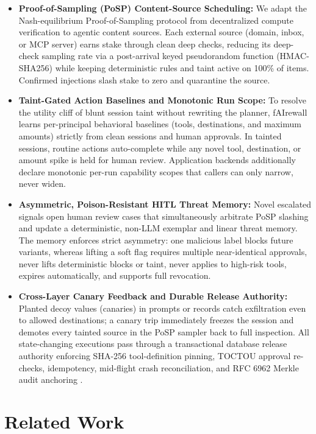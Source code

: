 \documentclass[conference]{IEEEtran}
\begin{document}
\begin{itemize}
    \item \textbf{Proof-of-Sampling (PoSP) Content-Source Scheduling:} We adapt the Nash-equilibrium Proof-of-Sampling protocol \cite{zhang2024posp} from decentralized compute verification to agentic content sources. Each external source (domain, inbox, or MCP server) earns stake through clean deep checks, reducing its deep-check sampling rate via a post-arrival keyed pseudorandom function (HMAC-SHA256) while keeping deterministic rules and taint active on 100\% of items. Confirmed injections slash stake to zero and quarantine the source.
    \item \textbf{Taint-Gated Action Baselines and Monotonic Run Scope:} To resolve the utility cliff of blunt session taint without rewriting the planner, fAIrewall learns per-principal behavioral baselines (tools, destinations, and maximum amounts) strictly from clean sessions and human approvals. In tainted sessions, routine actions auto-complete while any novel tool, destination, or amount spike is held for human review. Application backends additionally declare monotonic per-run capability scopes that callers can only narrow, never widen.
    \item \textbf{Asymmetric, Poison-Resistant HITL Threat Memory:} Novel escalated signals open human review cases that simultaneously arbitrate PoSP slashing and update a deterministic, non-LLM exemplar and linear threat memory. The memory enforces strict asymmetry: one malicious label blocks future variants, whereas lifting a soft flag requires multiple near-identical approvals, never lifts deterministic blocks or taint, never applies to high-risk tools, expires automatically, and supports full revocation.
    \item \textbf{Cross-Layer Canary Feedback and Durable Release Authority:} Planted decoy values (canaries) in prompts or records catch exfiltration even to allowed destinations; a canary trip immediately freezes the session and demotes every tainted source in the PoSP sampler back to full inspection. All state-changing executions pass through a transactional database release authority enforcing SHA-256 tool-definition pinning, TOCTOU approval re-checks, idempotency, mid-flight crash reconciliation, and RFC 6962 Merkle audit anchoring \cite{laurie2013rfc6962}.
\end{itemize}

\section{Related Work}
\end{document}
